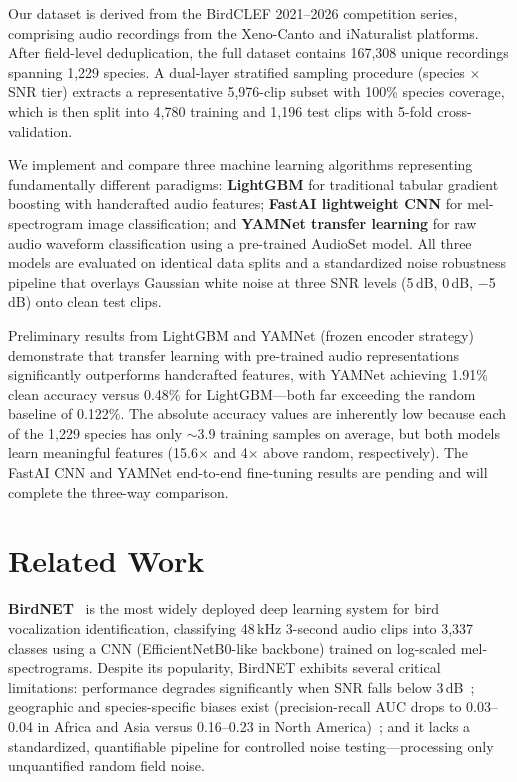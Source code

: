 \documentclass[conference]{IEEEtran}
\begin{document}
Our dataset is derived from the BirdCLEF 2021--2026 competition series, comprising audio recordings from the Xeno-Canto and iNaturalist platforms. After field-level deduplication, the full dataset contains 167,308 unique recordings spanning 1,229 species. A dual-layer stratified sampling procedure (species $\times$ SNR tier) extracts a representative 5,976-clip subset with 100\% species coverage, which is then split into 4,780 training and 1,196 test clips with 5-fold cross-validation.

We implement and compare three machine learning algorithms representing fundamentally different paradigms: \textbf{LightGBM} for traditional tabular gradient boosting with handcrafted audio features; \textbf{FastAI lightweight CNN} for mel-spectrogram image classification; and \textbf{YAMNet transfer learning} for raw audio waveform classification using a pre-trained AudioSet model. All three models are evaluated on identical data splits and a standardized noise robustness pipeline that overlays Gaussian white noise at three SNR levels (5\,dB, 0\,dB, $-$5\,dB) onto clean test clips.

Preliminary results from LightGBM and YAMNet (frozen encoder strategy) demonstrate that transfer learning with pre-trained audio representations significantly outperforms handcrafted features, with YAMNet achieving 1.91\% clean accuracy versus 0.48\% for LightGBM---both far exceeding the random baseline of 0.122\%. The absolute accuracy values are inherently low because each of the 1,229 species has only $\sim$3.9 training samples on average, but both models learn meaningful features (15.6$\times$ and 4$\times$ above random, respectively). The FastAI CNN and YAMNet end-to-end fine-tuning results are pending and will complete the three-way comparison.

\section{Related Work}
\textbf{BirdNET}~\cite{kahl2021birdnet} is the most widely deployed deep learning system for bird vocalization identification, classifying 48\,kHz 3-second audio clips into 3,337 classes using a CNN (EfficientNetB0-like backbone) trained on log-scaled mel-spectrograms. Despite its popularity, BirdNET exhibits several critical limitations: performance degrades significantly when SNR falls below 3\,dB~\cite{boreal_owl}; geographic and species-specific biases exist (precision-recall AUC drops to 0.03--0.04 in Africa and Asia versus 0.16--0.23 in North America)~\cite{funosas2026global}; and it lacks a standardized, quantifiable pipeline for controlled noise testing---processing only unquantified random field noise.
\end{document}
